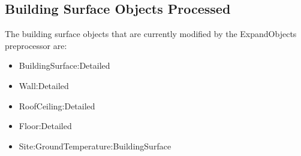 \subsection{Building Surface Objects Processed}\label{building-surface-objects-processed}

The building surface objects that are currently modified by the ExpandObjects preprocessor are:

\begin{itemize}
\item
  BuildingSurface:Detailed
\item
  Wall:Detailed
\item
  RoofCeiling:Detailed
\item
  Floor:Detailed
\item
  Site:GroundTemperature:BuildingSurface
\end{itemize}
